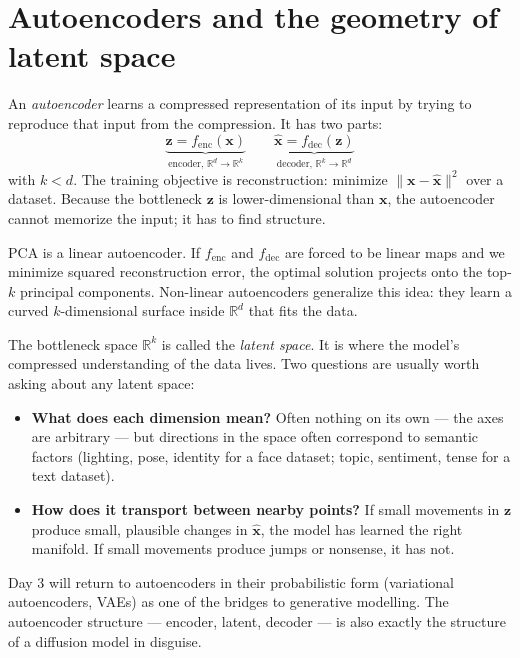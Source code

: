 \section{Autoencoders and the geometry of latent space}

An \emph{autoencoder} learns a compressed representation of its input by trying to reproduce that input from the compression. It has two parts:
\[
\underbrace{\bm{z} = f_{\text{enc}}(\bm{x})}_{\text{encoder, } \mathbb{R}^d \to \mathbb{R}^k} \qquad \underbrace{\hat{\bm{x}} = f_{\text{dec}}(\bm{z})}_{\text{decoder, } \mathbb{R}^k \to \mathbb{R}^d}
\]
with $k < d$. The training objective is reconstruction: minimize $\|\bm{x} - \hat{\bm{x}}\|^2$ over a dataset. Because the bottleneck $\bm{z}$ is lower-dimensional than $\bm{x}$, the autoencoder cannot memorize the input; it has to find structure.

\begin{intuition}
PCA is a linear autoencoder. If $f_{\text{enc}}$ and $f_{\text{dec}}$ are forced to be linear maps and we minimize squared reconstruction error, the optimal solution projects onto the top-$k$ principal components. Non-linear autoencoders generalize this idea: they learn a curved $k$-dimensional surface inside $\mathbb{R}^d$ that fits the data.
\end{intuition}

The bottleneck space $\mathbb{R}^k$ is called the \emph{latent space}. It is where the model's compressed understanding of the data lives. Two questions are usually worth asking about any latent space:

\begin{itemize}
  \item \textbf{What does each dimension mean?} Often nothing on its own --- the axes are arbitrary --- but directions in the space often correspond to semantic factors (lighting, pose, identity for a face dataset; topic, sentiment, tense for a text dataset).
  \item \textbf{How does it transport between nearby points?} If small movements in $\bm{z}$ produce small, plausible changes in $\hat{\bm{x}}$, the model has learned the right manifold. If small movements produce jumps or nonsense, it has not.
\end{itemize}

Day 3 will return to autoencoders in their probabilistic form (variational autoencoders, VAEs) as one of the bridges to generative modelling. The autoencoder structure --- encoder, latent, decoder --- is also exactly the structure of a diffusion model in disguise.

